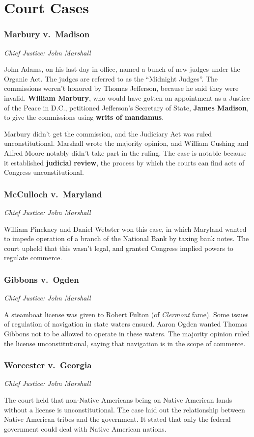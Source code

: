 \chapter{Court Cases}

\newcommand{\courtcase}[3]{%
  \subsection*{#1 \ifthenelse{\equal{#2}{}}{}{(#2)}}%
  \noindent\textit{Chief Justice: #3}%
}

\courtcase{Marbury v.\ Madison}{1803}{John Marshall}

John Adams, on his last day in office, named a bunch of new judges under the Organic Act.
The judges are referred to as the ``Midnight Judges''.
The commissions weren't honored by Thomas Jefferson, because he said they were invalid.
\textbf{William Marbury}, who would have gotten an appointment as a Justice of the Peace in D.C.,
petitioned Jefferson's Secretary of State, \textbf{James Madison},
to give the commissions using \textbf{writs of mandamus}.

Marbury didn't get the commission, and the Judiciary Act was ruled unconstitutional.
Marshall wrote the majority opinion, and William Cushing and Alfred Moore notably didn't take part in the ruling.
The case is notable because it established \textbf{judicial review},
the process by which the courts can find acts of Congress unconstitutional.

\courtcase{McCulloch v.\ Maryland}{1819}{John Marshall}

William Pinckney and Daniel Webster won this case,
in which Maryland wanted to impede operation of a branch of the National Bank by taxing bank notes.
The court upheld that this wasn't legal, and granted Congress implied powers to regulate commerce.

\courtcase{Gibbons v.\ Ogden}{1824}{John Marshall}

A steamboat license was given to Robert Fulton (of \textit{Clermont} fame).
Some issues of regulation of navigation in state waters ensued.
Aaron Ogden wanted Thomas Gibbons not to be allowed to operate in these waters.
The majority opinion ruled the license unconstitutional,
saying that navigation is in the scope of commerce.

\courtcase{Worcester v.\ Georgia}{1832}{John Marshall}

The court held that non-Native Americans being on Native American lands without a license is unconstitutional.
The case laid out the relationship between Native American tribes and the government.
It stated that only the federal government could deal with Native American nations.


